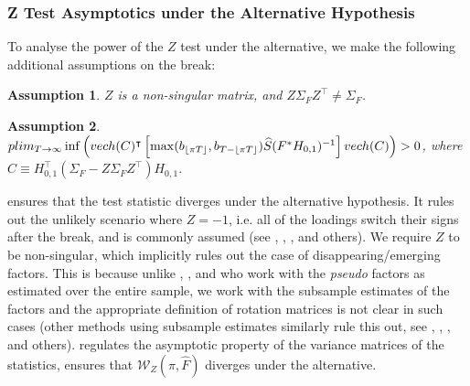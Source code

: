 \documentclass[12pt]{article}
\newtheorem{assump}{Assumption}
\newcommand*{\tran}{\intercal}
\theoremstyle{plain}
\numberwithin{equation}{section}
\begin{document}
\subsubsection{Z Test Asymptotics under the Alternative Hypothesis}
To analyse the power of the $Z$ test under the alternative, we make the following additional assumptions on the break:
\begin{assump}
\label{ass:11:Z_test_alter}
$Z$ is a non-singular matrix, and $Z \Sigma_F Z^\tran \neq \Sigma_F$.
\end{assump}
\begin{assump}
\label{ass:12:z_alter_variance} $
plim_{T \to \infty} \operatorname{inf} 
\left( vech(C)^\tran \left[ \operatorname{max}(b_{\floor{\pi T}}, b_{T - \floor{\pi T}} ) \widehat{S}(F^* H_{0, 1})^{-1} \right] vech(C) \right) \gt 0$, 
where $C \equiv H_{0, 1}^\tran (\Sigma_F - Z \Sigma_F Z^\tran) H_{0, 1}$.
\end{assump}
 ensures that the test statistic diverges under the alternative hypothesis. It rules out the unlikely scenario where $Z = -1$, i.e. all of the loadings switch their signs after the break, and is commonly assumed (see \textcite{han_tests_2015}, \textcite{baltagi_identification_2017}, \textcite{baltagi_estimating_2021}, and others).
We require $Z$ to be non-singular, which implicitly rules out the case of disappearing/emerging factors. This is because unlike \textcite{han_tests_2015}, \textcite{baltagi_estimating_2021}, and \textcite{duan_quasi-maximum_2022} who work with the \emph{pseudo} factors as estimated over the entire sample, we work with the subsample estimates of the factors and the appropriate definition of rotation matrices is not clear in such cases (other methods using subsample estimates similarly rule this out, see \textcite{chen_detecting_2014}, \textcite{massacci_least_2017}, \textcite{ma_estimation_2018}, and others).
 regulates the asymptotic property of the variance matrices of the statistics, ensures that $\mathscr{W}_Z(\pi, \widehat{F})$ diverges under the alternative.
\end{document}
